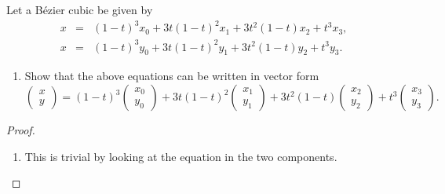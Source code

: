 \begin{exercise}
    Let a B\'ezier cubic be given by
    \begin{eqnarray*}
        x & = & (1-t)^3 x_0 + 3t(1-t)^2 x_1 + 3t^2 (1-t) x_2 + t^3 x_3,\\
        x & = & (1-t)^3 y_0 + 3t(1-t)^2 y_1 + 3t^2 (1-t) y_2 + t^3 y_3.        
    \end{eqnarray*}
    \begin{enumerate}
        \item Show that the above equations can be written in vector form
        $$\left(\begin{array}{c} x\\ y\end{array}\right) = (1-t)^3 \left(\begin{array}{c} x_0\\ y_0\end{array}\right) + 3t(1-t)^2\left(\begin{array}{c} x_1\\ y_1\end{array}\right) + 3t^2 (1-t) \left(\begin{array}{c} x_2\\ y_2\end{array}\right) + t^3 \left(\begin{array}{c} x_3\\ y_3\end{array}\right).$$
    \end{enumerate}
\end{exercise}
\begin{proof}
    \begin{enumerate}
        \item This is trivial by looking at the equation in the two components. 
    \end{enumerate}
\end{proof}











